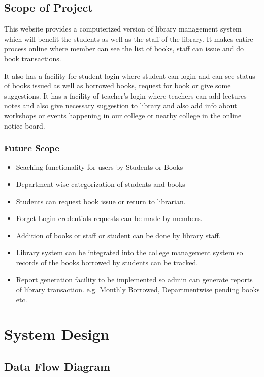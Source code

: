 \documentclass[12pt, a4paper]{report}
\begin{document}
\newpage
\section{Scope of Project}

This website provides a computerized version of library management system which will
benefit the students as well as the staff of the library.
It makes entire process online where member can see the list of books, staff can issue and
do book transactions.\par It also has a facility for student login where student can login and can see
status of books issued as well as borrowed books, request for book or give some suggestions. It has a facility of
teacher’s login where teachers can add lectures notes and also give necessary suggestion to
library and also add info about workshops or events happening in our college or nearby college
in the online notice board.


\subsection{Future Scope}
\begin{itemize}
	\item Seaching functionality for users by Students or Books
	\item Department wise categorization of students and books
	\item Students can request book issue or return to librarian.
	\item Forget Login credentials requests can be made by members.
	\item Addition of books or staff or student can be done by library staff.
	\item Library system can be integrated into the college management system so records of the books borrowed by students can be tracked.
	\item Report generation facility to be implemented so admin can generate reports of library transaction.
	e.g. Monthly Borrowed, Departmentwise pending books etc.
	
\end{itemize}

\chapter{System Design}

\section{Data Flow Diagram}
\end{document}
